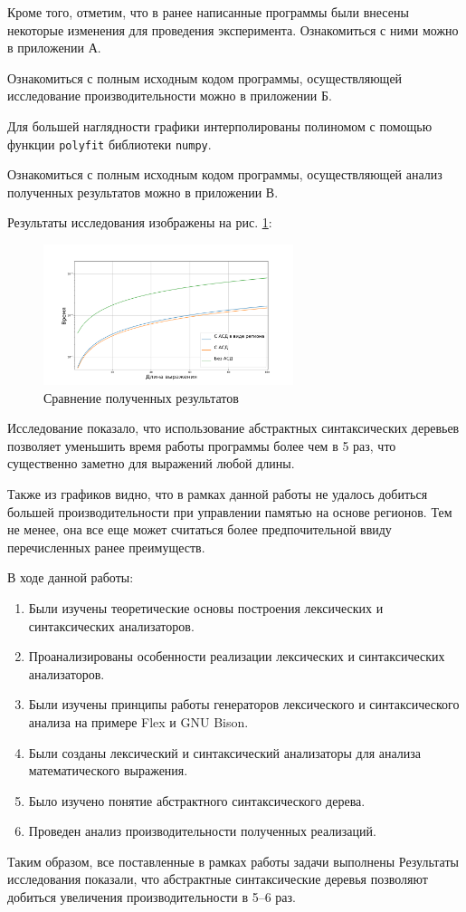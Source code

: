 \documentclass[coursework]{SCWorks}
\begin{document}
Кроме того, отметим, что в ранее написанные программы были внесены некоторые 
изменения для проведения эксперимента. Ознакомиться с ними можно в приложении А.

Ознакомиться с полным исходным кодом программы, осуществляющей исследование 
производительности можно в приложении Б.

Для большей наглядности графики интерполированы полиномом с помощью функции 
\texttt{polyfit} библиотеки \texttt{numpy}.

Ознакомиться с полным исходным кодом программы, осуществляющей анализ полученных 
результатов можно в приложении В.

Результаты исследования изображены на рис. \ref{img:benchmark}:
\begin{figure}[H]
    \centering
    \includegraphics[width=0.65\textwidth]{benchmark.png}
    \caption{Сравнение полученных результатов}
    \label{img:benchmark}
\end{figure} 
Исследование показало, что использование абстрактных синтаксических деревьев 
позволяет уменьшить время работы программы более чем в 5 раз, что существенно 
заметно для выражений любой длины.

Также из графиков видно, что в рамках данной работы не удалось добиться большей 
производительности при управлении памятью на основе регионов. Тем не менее, она 
все еще может считаться более предпочительной ввиду перечисленных ранее 
преимуществ.

\conclusion

В ходе данной работы:
\begin{enumerate}
    \item Были изучены теоретические основы построения лексических и 
    синтаксических анализаторов.
    \item Проанализированы особенности реализации лексических и синтаксических 
    анализаторов.
    \item Были изучены принципы работы генераторов лексического и 
    синтаксического анализа на примере Flex и GNU Bison. 
    \item Были созданы лексический и синтаксический анализаторы для анализа
    математического выражения.
    \item Было изучено понятие абстрактного синтаксического дерева.
    \item Проведен анализ производительности полученных реализаций.    
\end{enumerate}
Таким образом, все поставленные в рамках работы задачи выполнены
Результаты исследования показали, что абстрактные синтаксические деревья 
позволяют добиться увеличения производительности в 5–6 раз.
\end{document}
